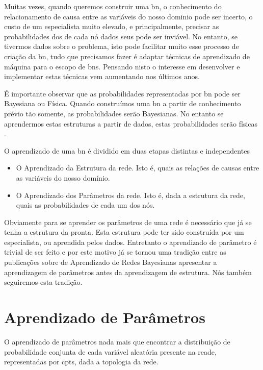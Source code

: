Muitas vezes, quando queremos construir uma \gls{bn}, o conhecimento do relacionamento de causa entre as variáveis do nosso dominio pode ser incerto, o custo de um especialista muito elevado, e principalmente, precisar as probabilidades dos de cada nó dados seus pode ser inviável. No entanto, se tivermos dados sobre o problema, isto pode facilitar muito esse processo de criação da \gls{bn}, tudo que precisamos fazer é adaptar técnicas de aprendizado de máquina para o escopo de \glspl{bn}. Pensando nisto o interesse em desenvolver e implementar estas técnicas vem aumentando nos últimos anos.

É importante observar que as probabilidades representadas por \gls{bn} pode ser Bayesiana ou Física. Quando construímos uma \gls{bn} a partir de conhecimento prévio tão somente, as probabilidades serão Bayesianas. No entanto se aprendermos estas estruturas a partir de dados, estas probabilidades serão físicas \cite{heck95}.

O aprendizado de uma \gls{bn} é dividido em duas etapas distintas e independentes
\begin{itemize}
	\item O Aprendizado da Estrutura da rede. Isto é, quais as relações de causas entre as variáveis do nosso domínio.
	\item O Aprendizado dos Parâmetros da rede. Isto é, dada a estrutura da rede, quais as probabilidades de cada um dos nós.
\end{itemize}

Obviamente para se aprender os parâmetros de uma rede é necessário que já se tenha a estrutura da pronta. Esta estrutura pode ter sido construída por um especialista, ou aprendida pelos dados. Entretanto o aprendizado de parâmetro é trivial de ser feito e por este motivo já se tornou uma tradição entre as publicações sobre de Aprendizado de Redes Bayesianas apresentar a aprendizagem de parâmetros antes da aprendizagem de estrutura. Nós também seguiremos esta tradição.

\section{Aprendizado de Parâmetros}
O aprendizado de parâmetros nada mais que encontrar a distribuição de probabilidade conjunta de cada variável aleatória presente na reade, representadas por \glspl{cpt}, dada a topologia da rede.

